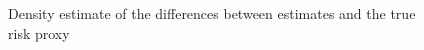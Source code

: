 \documentclass{article}
\begin{document}
\begin{figure}
    \caption{Density estimate of the differences between estimates and the true risk proxy}
    \label{fig:cross-fold}
\end{figure}


\printbibliography
\end{document}

